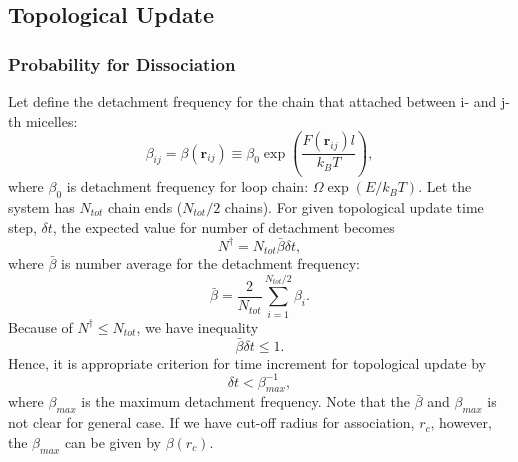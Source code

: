 \documentclass[10pt, a4paper]{article}
\begin{document}

\subsection{Topological Update}
\subsubsection{Probability for Dissociation}
Let define the detachment frequency for the chain that attached between i- and j-th micelles:
\begin{equation}
\beta_{ij} = \beta(\mathbf{r}_{ij}) \equiv \beta_0\exp\left(\frac{F(\mathbf{r}_{ij})l}{k_BT}\right),
\end{equation}
where $\beta_0$ is detachment frequency for loop chain: $\Omega\exp(E/k_BT)$.
Let the system has $N_{tot}$ chain ends ($N_{tot}/2$ chains). For given topological update time step, $\delta t$, the expected value for number of detachment becomes 
\begin{equation}
N^\dagger = N_{tot}\bar{\beta}\delta t,
\end{equation}
where $\bar{\beta}$ is number average for the detachment frequency:
\begin{equation}
\bar{\beta} = \frac{2}{N_{tot}} \sum_{i=1}^{N_{tot}/2}\beta_i.
\end{equation}
Because of $N^\dagger \leq N_{tot}$, we have inequality
\begin{equation}
\bar{\beta}{\delta t} \leq 1.
\end{equation}
Hence, it is appropriate criterion for time increment for topological update by
\begin{equation}
\delta t < \beta_{max}^{-1},
\end{equation}
where $\beta_{max}$ is the maximum detachment frequency. Note that the $\bar{\beta}$ and $\beta_{max}$ is not clear for general case. If we have cut-off radius for association, $r_c$, however, the $\beta_{max}$ can be given by $\beta(r_c)$.
\end{document}
